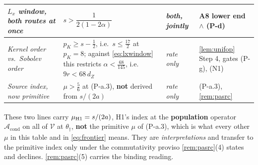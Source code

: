 \begin{center}
\begin{tabular}{@{}p{}p{}p{}p{}@{}}
\emph{$L_x$ window, both routes at once} & $s>\dfrac{1}{2(1-2\alpha)}$ & \emph{both, jointly} & A8 lower end $\wedge$ (P-d) \\
\midrule
\emph{Kernel order vs.\ Sobolev order} & $p_K\ge s-\tfrac12$, i.e.\ $s\le\tfrac{17}{2}$ at $p_K=8$; against \eqref{eq:lxwindow} this restricts $\alpha<\tfrac{68}{145}$, i.e.\ $9r<68\,d_Z$ & \emph{rate only} & \cref{lem:unifop} Step 4, gates (P-g), (N1) \\
\emph{Source index, now primitive} & $\mu>\tfrac56$ at (P-a.3), \textbf{not} derived from $s/(2a)$ & \emph{rate only} & (P-a.3), \cref{rem:pasrc} \\
\bottomrule
\end{tabular}
\end{center}
\noindent\textsuperscript{\dag}These two lines carry $\mu_{\text{\textup{H1}}}=s/(2a)$, H1's index at
the \textbf{population} operator $\mathcal A_{\mathrm{cond}}$ on all of $\mathcal V$ at $\theta_\dagger$, 
\textbf{not} the primitive $\mu$ of (P-a.3), which is what every other $\mu$ in this table and in
\eqref{eq:frontier} means. They are \emph{interpretations} and transfer to the primitive index only under
the commutativity proviso \cref{rem:pasrc}\textup{(4)} states and declines. \cref{rem:pasrc}\textup{(5)}
carries the binding reading.

